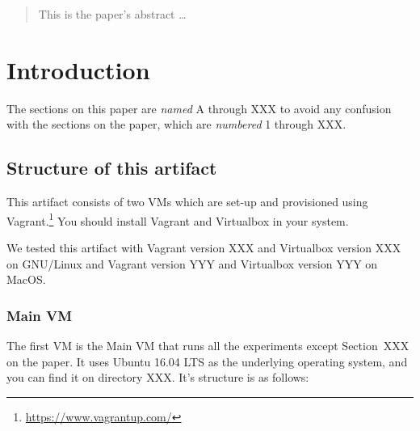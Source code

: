 \documentclass[12pt]{article}
\begin{document}
\maketitle

\begin{abstract}
This is the paper's abstract \ldots
\end{abstract}

\section{Introduction}

The sections on this paper are \emph{named} A through XXX to avoid any confusion with
the sections on the paper, which are \emph{numbered} 1 through XXX.

\subsection{Structure of this artifact}

This artifact consists of two VMs which are set-up and provisioned using
Vagrant.\footnote{\url{https://www.vagrantup.com/}}  You should install Vagrant
and Virtualbox in your system.

We tested this artifact with Vagrant version XXX and Virtualbox version XXX on
GNU/Linux and Vagrant version YYY and Virtualbox version YYY on MacOS.

\subsubsection{Main VM}
\label{sec:main}

The first VM is the Main VM that runs all the experiments except Section~XXX on
the paper.  It uses Ubuntu 16.04 LTS as the underlying operating system, and you
can find it on directory XXX.  It's structure is as follows:
\end{document}
